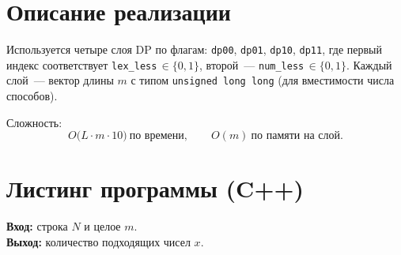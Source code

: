 \documentclass[12pt,a4paper]{article}
\begin{document}
\section*{Описание реализации}

Используется четыре слоя DP по флагам: \texttt{dp00}, \texttt{dp01}, \texttt{dp10}, \texttt{dp11},
где первый индекс соответствует \texttt{lex\_less}\,$\in\{0,1\}$, второй~--- \texttt{num\_less}\,$\in\{0,1\}$.
Каждый слой~--- вектор длины $m$ с типом \texttt{unsigned long long} (для вместимости числа способов).

Сложность:
\[
O\bigl(L \cdot m \cdot 10\bigr)\ \text{по времени},\qquad
O(m)\ \text{по памяти на слой}.
\]

\section*{Листинг программы (C++)}

\noindent\textbf{Вход:} строка $N$ и целое $m$. \\
\textbf{Выход:} количество подходящих чисел $x$.
\end{document}
